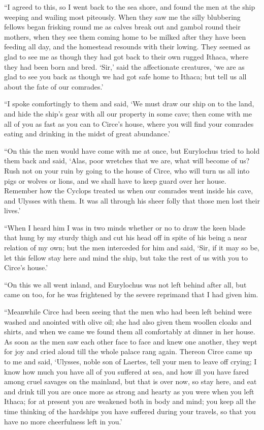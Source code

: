 “I agreed to this, so I went back to the sea shore, and found the men at the
ship weeping and wailing most piteously. When they saw me the silly blubbering
fellows began frisking round me as calves break out and gambol round their
mothers, when they see them coming home to be milked after they have been
feeding all day, and the homestead resounds with their lowing. They seemed as
glad to see me as though they had got back to their own rugged Ithaca, where
they had been born and bred. ‘Sir,’ said the affectionate creatures, ‘we are as
glad to see you back as though we had got safe home to Ithaca; but tell us all
about the fate of our comrades.’

“I spoke comfortingly to them and said, ‘We must draw our ship on to the land,
and hide the ship’s gear with all our property in some cave; then come with me
all of you as fast as you can to Circe’s house, where you will find your
comrades eating and drinking in the midst of great abundance.’

“On this the men would have come with me at once, but Eurylochus tried to hold
them back and said, ‘Alas, poor wretches that we are, what will become of us?
Rush not on your ruin by going to the house of Circe, who will turn us all into
pigs or wolves or lions, and we shall have to keep guard over her house.
Remember how the Cyclops treated us when our comrades went inside his cave, and
Ulysses with them. It was all through his sheer folly that those men lost their
lives.’

“When I heard him I was in two minds whether or no to draw the keen blade that
hung by my sturdy thigh and cut his head off in spite of his being a near
relation of my own; but the men interceded for him and said, ‘Sir, if it may so
be, let this fellow stay here and mind the ship, but take the rest of us with
you to Circe’s house.’

“On this we all went inland, and Eurylochus was not left behind after all, but
came on too, for he was frightened by the severe reprimand that I had given
him.

“Meanwhile Circe had been seeing that the men who had been left behind were
washed and anointed with olive oil; she had also given them woollen cloaks and
shirts, and when we came we found them all comfortably at dinner in her house.
As soon as the men saw each other face to face and knew one another, they wept
for joy and cried aloud till the whole palace rang again. Thereon Circe came up
to me and said, ‘Ulysses, noble son of Laertes, tell your men to leave off
crying; I know how much you have all of you suffered at sea, and how ill you
have fared among cruel savages on the mainland, but that is over now, so stay
here, and eat and drink till you are once more as strong and hearty as you were
when you left Ithaca; for at present you are weakened both in body and mind;
you keep all the time thinking of the hardships you have suffered during your
travels, so that you have no more cheerfulness left in you.’

